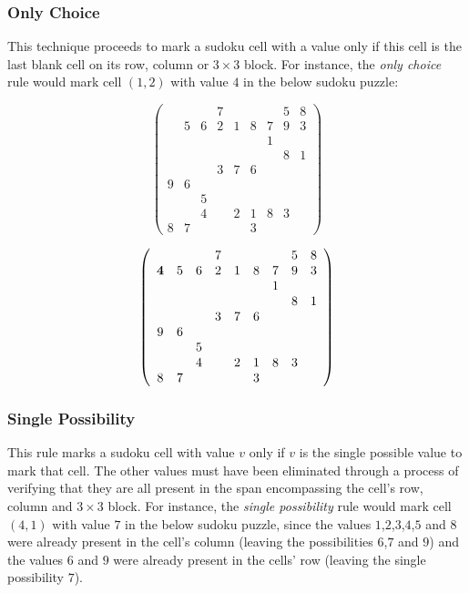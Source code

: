 \documentclass{article}
\begin{document}
\subsubsection{Only Choice}

This technique proceeds to mark a sudoku cell with a value only if this cell is the last blank cell on its row, column or $3 \times 3$ block. For instance, the {\em only choice} rule would mark cell $(1,2)$ with value $4$ in the below sudoku puzzle:

\[ \left( \begin{array}{ccccccccc}
  &   &   & 7 &   &   &   & 5 & 8 \\
  & 5 & 6 & 2 & 1 & 8 & 7 & 9 & 3 \\
  &   &   &   &   &   & 1 &   &   \\
  &   &   &   &   &   &   & 8 & 1 \\
  &   &   & 3 & 7 & 6 &   &   &   \\
9 & 6 &   &   &   &   &   &   &   \\
  &   & 5 &   &   &   &   &   &   \\
  &   & 4 &   & 2 & 1 & 8 & 3 &   \\
8 & 7 &   &   &   & 3 &   &   &   \end{array}  \right)\]

\[ \left( \begin{array}{ccccccccc}
  &   &   & 7 &   &   &   & 5 & 8 \\
{\bf 4} & 5 & 6 & 2 & 1 & 8 & 7 & 9 & 3 \\
  &   &   &   &   &   & 1 &   &   \\
  &   &   &   &   &   &   & 8 & 1 \\
  &   &   & 3 & 7 & 6 &   &   &   \\
9 & 6 &   &   &   &   &   &   &   \\
  &   & 5 &   &   &   &   &   &   \\
  &   & 4 &   & 2 & 1 & 8 & 3 &   \\
8 & 7 &   &   &   & 3 &   &   &   \end{array}  \right)\]

\subsubsection{Single Possibility}

This rule marks a sudoku cell with value $v$ only if $v$ is the single possible value to mark that cell. The other values must have been eliminated through a process of verifying that they are all present in the span encompassing the cell's row, column and $3 \times 3$ block. For instance, the {\em single possibility} rule would mark cell $(4,1)$ with value $7$ in the below sudoku puzzle, since the values $1$,$2$,$3$,$4$,$5$ and $8$ were already present in the cell's column (leaving the possibilities $6$,$7$ and $9$) and the values $6$ and $9$ were already present in the cells' row (leaving the single possibility $7$).
\end{document}
